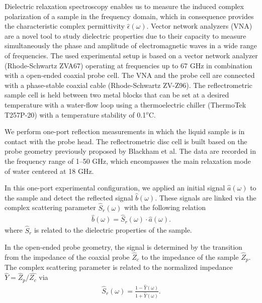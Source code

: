 Dielectric relaxation spectroscopy enables us to measure the induced complex polarization of a sample in the frequency domain, which in consequence provides the characteristic complex permittivity $\hat{\epsilon} (\omega)$. Vector network analyzers (VNA) are a novel tool to study dielectric properties due to their capacity to measure simultaneously the phase and amplitude of electromagnetic waves in a wide range of frequencies. The used experimental setup is based on a vector network analyzer (Rhode-Schwartz ZVA67) operating at frequencies up to 67 GHz in combination with a open-ended coaxial probe cell. The VNA and the probe cell are connected with a phase-stable coaxial cable (Rhode-Schwartz ZV-Z96). The reflectrometric sample cell is held between two metal blocks that can be set at a desired temperature with a water-flow loop using a thermoelectric chiller (ThermoTek T257P-20) with a temperature stability of 0.1$^o$C.



We perform one-port reflection measurements in which the liquid sample is in contact with the probe head. The reflectrometric disc cell is built based on the probe geometry previously proposed by Blackham et al.\!\cite{Blackham1997} The data are recorded in the frequency range of 1--50 GHz, which encompasses the main relaxation mode of water centered at 18 GHz.\!\cite{Ellison1996}


In this one-port experimental configuration, we applied an initial signal $\hat{a} (\omega)$ to the sample and detect the reflected signal $\hat{b} (\omega)$. These signals are linked via the complex scattering parameter $\hat{S}_{r} (\omega)$ with the following relation
\begin{eqnarray}
\hat{b} (\omega) = \hat{S}_{r} (\omega) \cdot \hat{a} (\omega).
\end{eqnarray}
\noindent where $\hat{S}_{r}$ is related to the dielectric properties of the sample.



In the open-ended probe geometry, the signal is determined by the transition from the impedance of the coaxial probe $\hat{Z}_{c}$ to the impedance of the sample $\hat{Z}_{p}$. The complex scattering parameter is related to the normalized impedance $\hat{Y} = \hat{Z}_p/\hat{Z_{c}}$ via
\begin{eqnarray}
\hat{S}_{r} (\omega) = \frac{1 - \hat{Y} (\omega) }{1 + \hat{Y} (\omega)}.
\end{eqnarray}



